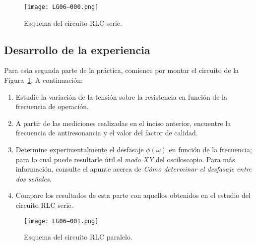 \documentclass[laboratorio]{guia}
\begin{document}
\begin{figure}[t!]
    \centering
    \texttt{[image: LG06--000.png]}
    \caption{Esquema del circuito RLC serie.}
    \label{fig:circuitoRLCserie}
\end{figure}

\subsection{Desarrollo de la experiencia}

Para esta segunda parte de la pr\'actica, comience por montar el 
circuito de la
Figura~\ref{fig:circuitoRLCserie}. A continuaci\'on:
\begin{enumerate}
    \item Estudie la variaci\'on de la tensi\'on sobre la resistencia en 
        funci\'on de la frecuencia de operaci\'on. 
    \item A partir de las mediciones realizadas en el inciso anterior,
        encuentre la frecuencia de antiresonancia y el valor del factor de
        calidad.     
    \item Determine experimentalmente el desfasaje $\phi(\omega)$ en funci\'on 
        de la frecuencia; para lo cual puede resultarle \'util el {\it modo XY}
        del osciloscopio. Para m\'as informaci\'on, consulte el apunte acerca
        de {\it C\'omo determinar el desfasaje entre dos se\~nales}.
    \item Compare los resultados de esta parte con aquellos obtenidos en el
        estudio del circuito RLC serie.
\end{enumerate}

\begin{figure}[t!]
    \centering
    \texttt{[image: LG06--001.png]}
    \caption{Esquema del circuito RLC paralelo.}
    \label{fig:circuitoRLCparalelo}
\end{figure}

\nocite{Alonso1998,Purcell1988,Reitz1996,Trelles1984,Reitz1996}
 

\end{document}

